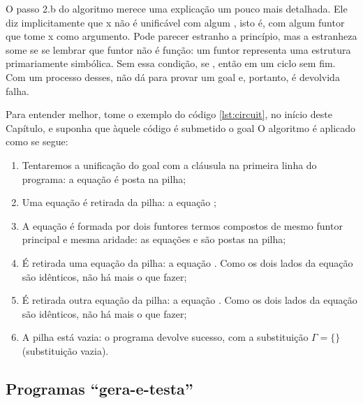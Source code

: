 \documentclass{article}
\begin{document}
O passo 2.b do algoritmo merece uma explicação um pouco mais
detalhada. Ele diz implicitamente que x não é unificável com algum
, isto é, com algum funtor que tome x
como argumento. Pode parecer estranho a princípio, mas a estranheza
some se se lembrar que funtor não é função: um funtor representa uma
estrutura primariamente simbólica. Sem essa condição, se , então  em um ciclo
sem fim. Com um processo desses, não dá para provar um goal e,
portanto, é devolvida falha. 

Para entender melhor, tome o exemplo do código \ref{lst:circuit}, no
início deste Capítulo, e suponha que àquele código é submetido o goal
 O algoritmo é aplicado como se segue: 

  \begin{enumerate}
    \item Tentaremos a unificação do goal com a cláusula na primeira
      linha do programa: a equação  é posta na pilha; 
    \item Uma equação é retirada da pilha: a equação ;
    \item A equação é formada por dois funtores termos compostos de
      mesmo funtor principal e mesma aridade: as equações
       e  são postas na
      pilha; 
    \item É retirada uma equação da pilha: a equação . Como os dois lados da equação são idênticos, não há
      mais o que fazer; 
    \item É retirada outra equação da pilha: a equação . Como os dois lados da equação são idênticos, não há mais o que fazer;
    \item A pilha está vazia: o programa devolve sucesso, com a substituição $\Gamma = \{\}$ (substituição vazia).
  \end{enumerate}


  \subsection{Programas ``gera-e-testa''}
\end{document}
